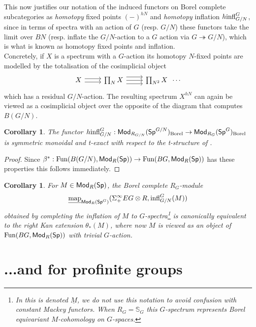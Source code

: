 \documentclass[reqno]{amsart}
\numberwithin{equation}{section}\theoremstyle{thms}
\newtheorem{cor}[equation]{Corollary}
\theoremstyle{defn}
\newcommand{\bS}{\mathbb{S}}
\newcommand{\tn}[1]{\textnormal{#1}}
\newcommand{\tsf}[1]{\textsf{\textup{#1}}}
\newcommand{\underl}[1]{\underline{#1}}
\newcommand{\fun}{\tn{Fun}}
\newcommand{\imap}{\underl{\tn{map}}}
\newcommand{\Mod}{\tsf{Mod}}
\newcommand{\spec}{\tsf{Sp}}
\newcommand{\specg}{\tsf{Sp}^G}
\begin{document}
This now justifies our notation of the induced functors on Borel complete subcategories as \emph{homotopy} fixed points $(-)^{hN}$ and \emph{homotopy} inflation $h\tn{infl}^G_{G/N}$, since in terms of spectra with an action of $G$ (resp. $G/N$) these functors take the limit over $BN$ (resp. inflate the $G/N$-action to a $G$ action via $G \twoheadrightarrow G/N$), which is what is known as homotopy fixed points and inflation. \\
Concretely, if $X$ is a spectrum with a $G$-action its homotopy $N$-fixed points are modelled by the totalisation of the cosimplicial object 
\[\begin{tikzcd}
	X & {\prod_N X} & {\prod_{N^2} X \;\; \cdots}
	\arrow[shift left, from=1-1, to=1-2]
	\arrow[shift right, from=1-1, to=1-2]
	\arrow[from=1-2, to=1-3]
	\arrow[shift left=2, from=1-2, to=1-3]
	\arrow[shift right=2, from=1-2, to=1-3]
\end{tikzcd}\]
which has a residual $G/N$-action. The resulting spectrum $X^{hN}$ can again be viewed as a cosimplicial object over the opposite of the diagram that computes $B(G/N)$. 

\begin{cor}
The functor $h\tn{infl}^G_{G/N}: \Mod_{R_{G/N}}(\spec^{G/N})_{\tn{Borel}} \to \Mod_{R_G}(\specg)_{\tn{Borel}}$ is symmetric monoidal and t-exact with respect to the t-structure of .
\end{cor}
\begin{proof}
Since $\beta^*: \fun(B(G/N),\Mod_R(\spec)) \to \fun(BG,\Mod_R(\spec))$ has these properties this follows immediately.
\end{proof}

\begin{cor}
For $M \in \Mod_R(\spec)$, the Borel complete $R_G$-module 
$$\imap_{\Mod_R(\specg)}(\Sigma^{\infty}_+EG \otimes R, \tn{infl}^G_{G/N}(M))$$
obtained by completing the inflation of $M$ to $G$-spectra\footnote{In \cite[Example 6.20]{mnn17} this is denoted $\underl{M}$, we do not use this notation to avoid confusion with constant Mackey functors. When $R_G = \bS_G$ this $G$-spectrum represents Borel equivariant $M$-cohomology on $G$-spaces.} is canonically equivalent to the right Kan extension $\theta_*(M)$, where now $M$ is viewed as an object of $\fun(BG,\Mod_R(\spec))$ with trivial $G$-action.
\end{cor}

\section{...and for profinite groups}\label{sec:borelprofinite}
\end{document}
